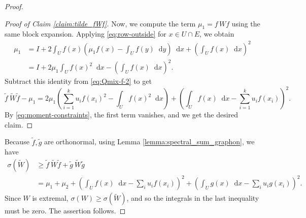 \documentclass[10pt,a4paper]{amsart}
\newcommand{\dif}{\mathop{}\!\mathrm{d}}
\begin{document}
\begin{proof}
\begin{proof}[Proof of Claim \ref{claim:tilde_fWf}]
Now, we compute the term $\mu_1=f\, Wf$ using the same block expansion. 
Applying \eqref{eq:row-outside} for $x\in U\cap E$, we obtain
\begin{align*}
\mu_1 
& = I + 2\int_U f(x)\left(\mu_1 f(x)-\int_U f(y)\dif{y}\right) \dif{x} + \left(\int_U f(x)\dif{x}\right)^2 \\
& = I + 2\mu_1\int_U f(x)^2 \dif{x} - \left(\int_U f(x) \dif{x}\right)^2.
\end{align*}
Subtract this identity from \eqref{eq:Qmix-f-2} to get
\[
\tilde f\ \widetilde{W}\tilde f -\mu_1
=2\mu_1\left(\sum_{i=1}^k u_i f(x_i)^2 - \int_U f(x)^2 \dif{x} \right)
+\left(\int_U f(x)\dif{x} -\sum_{i=1}^k u_i f(x_i)\right)^2.
\]
By \eqref{eq:moment-constraints}, the first term vanishes, and we get the desired claim. 
\end{proof}

Because $\tilde f,\tilde g$ are orthonormal, using Lemma \ref{lemma:spectral_sum_graphon}, we have
\begin{align*}
\sigma(\widetilde{W})
& \geq \tilde f\ \widetilde{W}\tilde f + \tilde g\ \widetilde{W}\tilde g \\
& = \mu_1+\mu_2 + \left(\int_U f(x) \dif{x} -\sum_i u_i f(x_i)\right)^2 
+ \left(\int_U g(x) \dif{x} -\sum_i u_i g(x_i)\right)^2.
\end{align*}
Since $W$ is extremal, $\sigma(W)\ge \sigma(\widetilde{W})$, and so the integrals in the 
last inequality must be zero. The assertion follows.
\end{proof}
\end{document}
